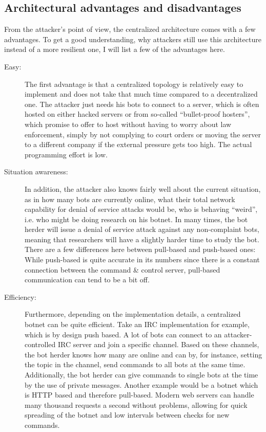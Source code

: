 \documentclass[10pt, a4paper, twocolumn]{article} %
\begin{document}
\subsection{Architectural advantages and disadvantages}
From the attacker's point of view, the centralized architecture comes with a few advantages. To get a good understanding, why attackers still use this architecture instead of a more resilient one, I will list a few of the advantages here. 
\begin{description}
\item[Easy:]
The first advantage is that a centralized topology is relatively easy to implement and does not take that much time compared to a decentralized one. The attacker just needs his bots to connect to a server, which is often hosted on either hacked servers or from so-called ``bullet-proof hosters'', which promise to offer to host without having to worry about law enforcement, simply by not complying to court orders or moving the server to a different company if the external pressure gets too high. The actual programming effort is low. 
\item[Situation awareness:]
In addition, the attacker also knows fairly well about the current situation, as in how many bots are currently online, what their total network capability for denial of service attacks would be, who is behaving ``weird'', i.e. who might be doing research on his botnet. In many times, the bot herder will issue a denial of service attack against any non-complaint bots, meaning that researchers will have a slightly harder time to study the bot. There are a few differences here between pull-based and push-based ones: While push-based is quite accurate in its numbers since there is a constant connection between the command \& control server, pull-based communication can tend to be a bit off. 
\item[Efficiency:]
Furthermore, depending on the implementation details, a centralized botnet can be quite efficient. Take an IRC implementation for example, which is by design push based. A lot of bots can connect to an attacker-controlled IRC server and join a specific channel. Based on these channels, the bot herder knows how many are online and can by, for instance, setting the topic in the channel, send commands to all bots at the same time. Additionally, the bot herder can give commands to single bots at the time by the use of private messages. Another example would be a botnet which is HTTP based and therefore pull-based. Modern web servers can handle many thousand requests a second without problems\cite{nginx}, allowing for quick spreading of the botnet and low intervals between checks for new commands. 
\end{description}
\end{document}
